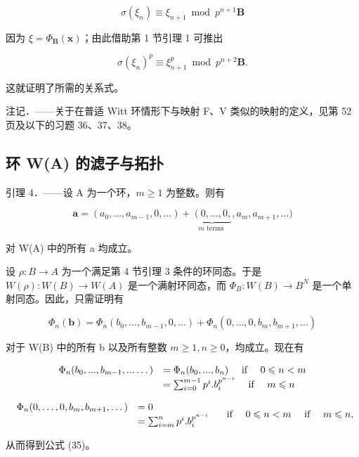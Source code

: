 \[
\sigma (\xi_ {n}) \equiv \xi_ {n + 1} \bmod p ^ {n + 1} \mathbf {B}
\]

因为 \(\xi = \Phi_{\mathbf{B}}(\boldsymbol{x})\)；由此借助第 1 节引理 1 可推出

\[
\sigma (\xi_ {n}) ^ {p} \equiv \xi_ {n + 1} ^ {p} \bmod p ^ {n + 2} \mathbf {B}.
\]

这就证明了所需的关系式。

注记．——关于在普适 Witt 环情形下与映射 F、V 类似的映射的定义，见第 52 页及以下的习题 36、37、38。

\subsection{环 W(A) 的滤子与拓扑}

引理 4．——设 A 为一个环，\(m \geqslant 1\) 为整数。则有

\[
\boldsymbol {a} = \left(a _ {0}, \dots , a _ {m - 1}, 0, \dots\right) + \underbrace {\left(0 , \dots , 0 , \right.} _ {m \text { terms }}, a _ {m}, a _ {m + 1}, \dots)\tag{34}
\]

对 W(A) 中的所有 a 均成立。

设 \(\rho: B \to A\) 为一个满足第 4 节引理 3 条件的环同态。于是 \(W(\rho): W(B) \to W(A)\) 是一个满射环同态，而 \(\Phi_B: W(B) \to B^N\) 是一个单射同态。因此，只需证明有

\[
\Phi_ {n} (\boldsymbol {b}) = \Phi_ {n} (b _ {0},..., b _ {m - 1}, 0,...) + \Phi_ {n} (0,..., 0, b _ {m}, b _ {m + 1},...) \tag{35}
\]

对于 W(B) 中的所有 b 以及所有整数 \(m \geqslant 1, n \geqslant 0\)，均成立。现在有

\[
\begin{array}{r l} \Phi_ {n} (b _ {0},..., b _ {m - 1},... \dots) & = \Phi_ {n} (b _ {0},..., b _ {n}) \quad \text { if } \quad 0 \leqslant n <   m \\ & = \sum_ {i = 0} ^ {m - 1} p ^ {i}. b _ {i} ^ {p ^ {n - i}} \quad \text { if } \quad m \leqslant n \end{array}
\]

\[
\begin{array}{r l} \Phi_ {n} (0, \dots , 0, b _ {m}, b _ {m + 1}, \dots) & = 0 \\ & = \sum_ {i = m} ^ {n} p ^ {i}. b _ {i} ^ {p ^ {n - i}} \end{array} \quad \text { if } \quad 0 \leqslant n <   m \quad \text { if } \quad m \leqslant n,
\]

从而得到公式 (35)。

